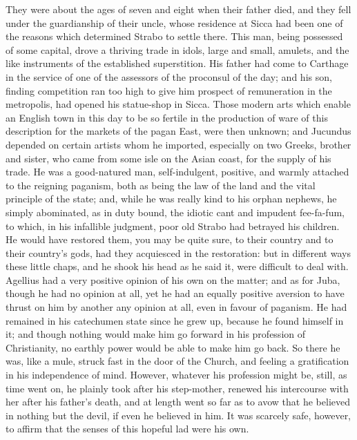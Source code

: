 They were about the ages of seven and eight when their father died,
and they fell under the guardianship of their uncle, whose residence
at Sicca had been one of the reasons which determined Strabo to
settle there. This man, being possessed of some capital, drove a
thriving trade in idols, large and small, amulets, and the like
instruments of the established superstition. His father had come to
Carthage in the service of one of the assessors of the proconsul of
the day; and his son, finding competition ran too high to give him
prospect of remuneration in the metropolis, had opened his statue-shop
in Sicca. Those modern arts which enable an English town in this day
to be so fertile in the production of ware of this description for the
markets of the pagan East, were then unknown; and Jucundus depended on
certain artists whom he imported, especially on two Greeks, brother
and sister, who came from some isle on the Asian coast, for the supply
of his trade. He was a good-natured man, self-indulgent, positive, and
warmly attached to the reigning paganism, both as being the law of the
land and the vital principle of the state; and, while he was really
kind to his orphan nephews, he simply abominated, as in duty bound,
the idiotic cant and impudent fee-fa-fum, to which, in his infallible
judgment, poor old Strabo had betrayed his children. He would have
restored them, you may be quite sure, to their country and to their
country's gods, had they acquiesced in the restoration: but in
different ways these little chaps, and he shook his head as he said
it, were difficult to deal with. Agellius had a very positive opinion
of his own on the matter; and as for Juba, though he had no opinion at
all, yet he had an equally positive aversion to have thrust on
him by another any opinion at all, even in favour of paganism. He had
remained in his catechumen state since he grew up, because he found
himself in it; and though nothing would make him go forward in his
profession of Christianity, no earthly power would be able to make him
go back. So there he was, like a mule, struck fast in the door of the
Church, and feeling a gratification in his independence of mind.
However, whatever his profession might be, still, as time went on, he
plainly took after his step-mother, renewed his intercourse with her
after his father's death, and at length went so far as to avow that he
believed in nothing but the devil, if even he believed in him. It was
scarcely safe, however, to affirm that the senses of this hopeful lad
were his own.

